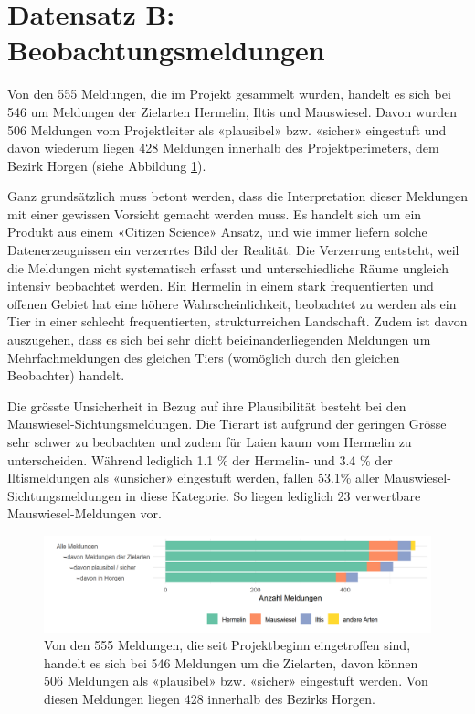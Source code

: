 \documentclass[
  oneside]{scrbook}
\begin{document}
\hypertarget{datensatz-b-beobachtungsmeldungen-1}{%
\section{Datensatz B: Beobachtungsmeldungen}\label{datensatz-b-beobachtungsmeldungen-1}}

Von den 555 Meldungen, die im Projekt gesammelt wurden, handelt es sich bei 546 um Meldungen der Zielarten Hermelin, Iltis und Mauswiesel. Davon wurden 506 Meldungen vom Projektleiter als «plausibel» bzw. «sicher» eingestuft und davon wiederum liegen 428 Meldungen innerhalb des Projektperimeters, dem Bezirk Horgen (siehe Abbildung \ref{fig:beobachtungsmeldungenfilter}).

Ganz grundsätzlich muss betont werden, dass die Interpretation dieser Meldungen mit einer gewissen Vorsicht gemacht werden muss. Es handelt sich um ein Produkt aus einem «Citizen Science» Ansatz, und wie immer liefern solche Datenerzeugnissen ein verzerrtes Bild der Realität. Die Verzerrung entsteht, weil die Meldungen nicht systematisch erfasst und unterschiedliche Räume ungleich intensiv beobachtet werden. Ein Hermelin in einem stark frequentierten und offenen Gebiet hat eine höhere Wahrscheinlichkeit, beobachtet zu werden als ein Tier in einer schlecht frequentierten, strukturreichen Landschaft. Zudem ist davon auszugehen, dass es sich bei sehr dicht beieinanderliegenden Meldungen um Mehrfachmeldungen des gleichen Tiers (womöglich durch den gleichen Beobachter) handelt.

Die grösste Unsicherheit in Bezug auf ihre Plausibilität besteht bei den Mauswiesel-Sichtungsmeldungen. Die Tierart ist aufgrund der geringen Grösse sehr schwer zu beobachten und zudem für Laien kaum vom Hermelin zu unterscheiden. Während lediglich 1.1 \% der Hermelin- und 3.4 \% der Iltismeldungen als «unsicher» eingestuft werden, fallen 53.1\% aller Mauswiesel-Sichtungsmeldungen in diese Kategorie. So liegen lediglich 23 verwertbare Mauswiesel-Meldungen vor.



\begin{figure}
\includegraphics[width=1\linewidth]{images/beobachtungsmeldungen_filter} \caption{Von den 555 Meldungen, die seit Projektbeginn eingetroffen sind, handelt es sich bei 546 Meldungen um die Zielarten, davon können 506 Meldungen als «plausibel» bzw. «sicher» eingestuft werden. Von diesen Meldungen liegen 428 innerhalb des Bezirks Horgen.}\label{fig:beobachtungsmeldungenfilter}
\end{figure}
\end{document}
